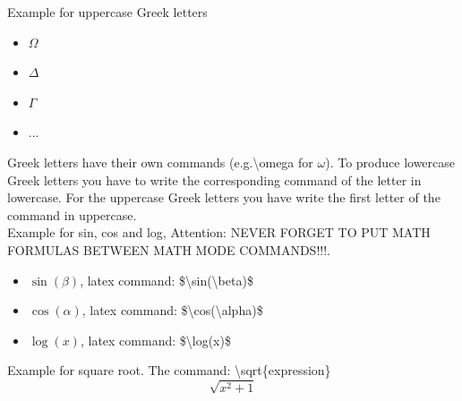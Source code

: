     Example for uppercase Greek letters
    \begin{itemize}
        \item $\Omega$
        \item $\Delta$
        \item $\Gamma$
        \item ...
    \end{itemize}
    Greek letters have their own commands (e.g.\textbackslash omega for $\omega$). To produce lowercase Greek
    letters you have to write the corresponding command of the letter in 
    lowercase. For the uppercase Greek letters you have write the first
    letter of the command in uppercase.\\

    Example for sin, cos and log, Attention: NEVER FORGET TO PUT MATH FORMULAS
    BETWEEN MATH MODE COMMANDS!!!.
    \begin{itemize}
        \item $\sin(\beta)$, latex command:  \$\textbackslash sin(\textbackslash beta)\$ 
        \item $\cos(\alpha)$, latex command:  \$\textbackslash cos(\textbackslash alpha)\$ 
        \item $\log(x)$, latex command:  \$\textbackslash log(x)\$ 
    \end{itemize}

    Example for square root. The command: \textbackslash sqrt\{expression\}
    \[\sqrt{x^2+1}\]




%           
%           
%           
%           
%           
%           
%           
%           
% 
%
%
% 
%
%
% 
%
%
% 
%
%
% 
%
%
% 
%
%
% 
